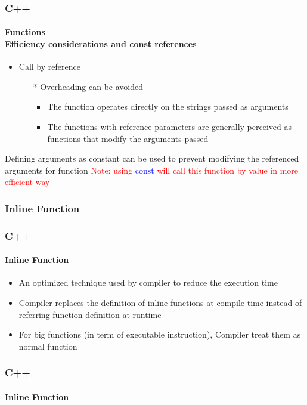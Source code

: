 \documentclass[hyperref={pdfpagelabels=true}]{beamer}
\begin{document}
\begin{frame}[shrink]
\frametitle{C++}
\framesubtitle{{\small Functions} \\ {\scriptsize Efficiency considerations and const references}}
    \begin{itemize} 
 \item Call by reference
    \begin{itemize}
\item[*] Overheading can be avoided
\begin{itemize}
\item  The function operates directly on the strings passed as arguments
\item  The functions with reference parameters are generally perceived as functions that modify the arguments passed \\

\end{itemize}
\end{itemize}
\pause
{\tiny }
\end{itemize}
\pause
Defining arguments as constant can be used to prevent modifying the referenced arguments for function 
{\tiny }
\noindent\makebox[\linewidth]{\rule{10 cm}{0.1pt}}
\textcolor{red}{Note: using \textcolor{blue}{const} will call this function by value in more efficient way }
\end{frame}




\subsubsection{Inline Function}
\begin{frame}
\frametitle{C++}
\framesubtitle{Inline Function}
\begin{itemize}
\item An optimized technique used by compiler to reduce the execution time \pause
  \item Compiler replaces the definition of inline functions at compile time instead of referring function definition at runtime \pause
  \item For big functions (in term of executable instruction), Compiler treat them as normal function
\end{itemize}
\end{frame}

\begin{frame}
\frametitle{C++}
\framesubtitle{Inline Function}
{\tiny }
\end{frame}
\end{document}
